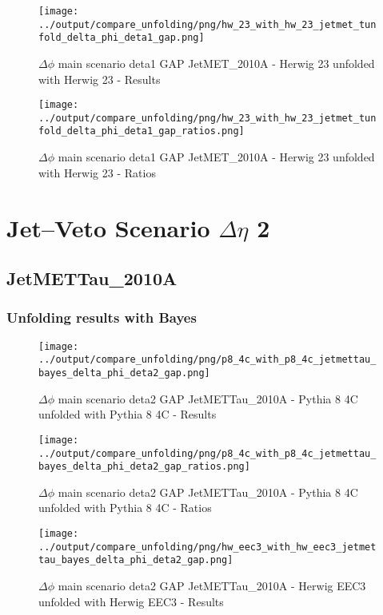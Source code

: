 \documentclass[11pt]{book}
\begin{document}
\begin{figure}[ht]
\centering
\texttt{[image: ../output/compare\_unfolding/png/hw\_23\_with\_hw\_23\_jetmet\_tunfold\_delta\_phi\_deta1\_gap.png]}
\caption{$\Delta\phi$ main scenario deta1 GAP JetMET\_2010A - Herwig 23 unfolded with Herwig 23 - Results}
\label{hw_23_hw_23_jetmet_tunfold_delta_phi_deta1_gap_a}
\end{figure}

\begin{figure}[ht]
\centering
\texttt{[image: ../output/compare\_unfolding/png/hw\_23\_with\_hw\_23\_jetmet\_tunfold\_delta\_phi\_deta1\_gap\_ratios.png]}
\caption{$\Delta\phi$ main scenario deta1 GAP JetMET\_2010A - Herwig 23 unfolded with Herwig 23 - Ratios}
\label{hw_23_hw_23_jetmet_tunfold_delta_phi_deta1_gap_b}
\end{figure}


\cleardoublepage
\chapter{Jet--Veto Scenario $\Delta\eta$ 2}
\section{JetMETTau\_2010A}
\subsection{Unfolding results with Bayes}

\begin{figure}[ht]
\centering
\texttt{[image: ../output/compare\_unfolding/png/p8\_4c\_with\_p8\_4c\_jetmettau\_bayes\_delta\_phi\_deta2\_gap.png]}
\caption{$\Delta\phi$ main scenario deta2 GAP JetMETTau\_2010A - Pythia 8 4C unfolded with Pythia 8 4C - Results}
\label{p8_p8_jetmettau_bayes_delta_phi_deta2_gap_a}
\end{figure}

\begin{figure}[ht]
\centering
\texttt{[image: ../output/compare\_unfolding/png/p8\_4c\_with\_p8\_4c\_jetmettau\_bayes\_delta\_phi\_deta2\_gap\_ratios.png]}
\caption{$\Delta\phi$ main scenario deta2 GAP JetMETTau\_2010A - Pythia 8 4C unfolded with Pythia 8 4C - Ratios}
\label{p8_p8_jetmettau_bayes_delta_phi_deta2_gap_b}
\end{figure}

\begin{figure}[ht]
\centering
\texttt{[image: ../output/compare\_unfolding/png/hw\_eec3\_with\_hw\_eec3\_jetmettau\_bayes\_delta\_phi\_deta2\_gap.png]}
\caption{$\Delta\phi$ main scenario deta2 GAP JetMETTau\_2010A - Herwig EEC3 unfolded with Herwig EEC3 - Results}
\label{hw_eec3_hw_eec3_jetmettau_bayes_delta_phi_deta2_gap_a}
\end{figure}
\end{document}
